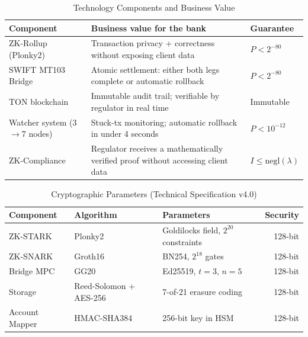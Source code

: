 \documentclass[11pt,a4paper]{article}
\begin{document}
\begin{table}[htbp]
\centering
\caption{Technology Components and Business Value}
\begin{tabularx}{\linewidth}{@{}lXl@{}}
\toprule
\textbf{Component} & \textbf{Business value for the bank} & \textbf{Guarantee} \\
\midrule
ZK-Rollup (Plonky2)~\cite{plonky2}      & Transaction privacy + correctness without exposing client data             & $P < 2^{-80}$ \\
SWIFT MT103 Bridge~\cite{swift_mt103}       & Atomic settlement: either both legs complete or automatic rollback         & $P < 2^{-80}$ \\
TON blockchain~\cite{ton_wp,ton_docs}           & Immutable audit trail; verifiable by regulator in real time                & Immutable \\
Watcher system (3$\to$7 nodes) & Stuck-tx monitoring; automatic rollback in under 4 seconds                & $P < 10^{-12}$ \\
ZK-Compliance~\cite{fatf_aml_tech}            & Regulator receives a mathematically verified proof without accessing client data & $I \leq \text{negl}(\lambda)$ \\
\bottomrule
\end{tabularx}
\end{table}

\begin{table}[htbp]
\centering
\caption{Cryptographic Parameters (Technical Specification v4.0)}
\footnotesize
\begin{tabularx}{\linewidth}{@{}lLLr@{}}
\toprule
\textbf{Component} & \textbf{Algorithm} & \textbf{Parameters} & \textbf{Security} \\
\midrule
ZK-STARK    & Plonky2~\cite{plonky2}       & Goldilocks field, $2^{20}$ constraints           & 128-bit \\
ZK-SNARK    & Groth16~\cite{groth16}       & BN254, $2^{18}$ gates                            & 128-bit \\
Bridge MPC  & GG20          & Ed25519, $t{=}3$, $n{=}5$                & 128-bit \\
Storage     & Reed-Solomon + AES-256 & 7-of-21 erasure coding            & 128-bit \\
Account Mapper & HMAC-SHA384 & 256-bit key in HSM                     & 128-bit \\
\bottomrule
\end{tabularx}
\end{table}
\end{document}
